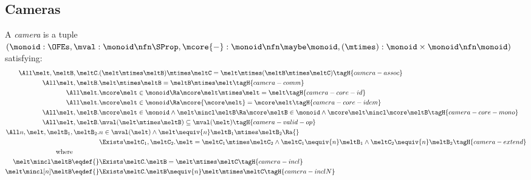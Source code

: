 \subsection{Cameras}

\begin{defn}
  A \emph{camera} is a tuple $(\monoid : \OFEs, \mval : \monoid \nfn \SProp, \mcore{{-}}: \monoid \nfn \maybe\monoid,\\ (\mtimes) : \monoid \times \monoid \nfn \monoid)$ satisfying:
  \begin{align*}
    \All \melt, \meltB, \meltC.& (\melt \mtimes \meltB) \mtimes \meltC = \melt \mtimes (\meltB \mtimes \meltC) \tagH{camera-assoc} \\
    \All \melt, \meltB.& \melt \mtimes \meltB = \meltB \mtimes \melt \tagH{camera-comm} \\
    \All \melt.& \mcore\melt \in \monoid \Ra \mcore\melt \mtimes \melt = \melt \tagH{camera-core-id} \\
    \All \melt.& \mcore\melt \in \monoid \Ra \mcore{\mcore\melt} = \mcore\melt \tagH{camera-core-idem} \\
    \All \melt, \meltB.& \mcore\melt \in \monoid \land \melt \mincl \meltB \Ra \mcore\meltB \in \monoid \land \mcore\melt \mincl \mcore\meltB \tagH{camera-core-mono} \\
    \All \melt, \meltB.& \mval(\melt \mtimes \meltB) \subseteq \mval(\melt)  \tagH{camera-valid-op} \\
    \All n, \melt, \meltB_1, \meltB_2.& \omit\rlap{$n \in \mval(\melt) \land \melt \nequiv{n} \meltB_1 \mtimes \meltB_2 \Ra {}$} \\
    &\Exists \meltC_1, \meltC_2. \melt = \meltC_1 \mtimes \meltC_2 \land \meltC_1 \nequiv{n} \meltB_1 \land \meltC_2 \nequiv{n} \meltB_2 \tagH{camera-extend} \\
    \text{where}\qquad\qquad\\
    \melt \mincl \meltB \eqdef{}& \Exists \meltC. \meltB = \melt \mtimes \meltC \tagH{camera-incl} \\
    \melt \mincl[n] \meltB \eqdef{}& \Exists \meltC. \meltB \nequiv{n} \melt \mtimes \meltC \tagH{camera-inclN}
  \end{align*}
\end{defn}

